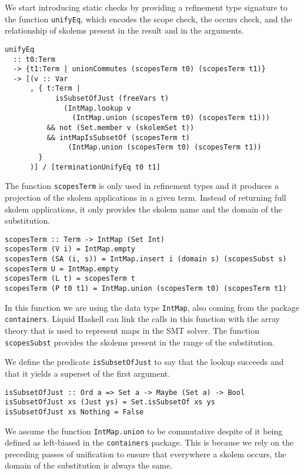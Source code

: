 \documentclass[acmtog, anonymous]{acmart}
\newcommand{\tc}[1]{{\small\texttt{#1}}}
\begin{document}
We start introducing static checks by providing a refinement type signature to
the function \tc{unifyEq}, which encodes the scope check, the occurs check,
and the relationship of skolems present in the result and in the arguments.

\begin{verbatim}
unifyEq
  :: t0:Term
  -> {t1:Term | unionCommutes (scopesTerm t0) (scopesTerm t1)}
  -> [(v :: Var
      , { t:Term |
            isSubsetOfJust (freeVars t)
              (IntMap.lookup v
                (IntMap.union (scopesTerm t0) (scopesTerm t1)))
          && not (Set.member v (skolemSet t))
          && intMapIsSubsetOf (scopesTerm t)
               (IntMap.union (scopesTerm t0) (scopesTerm t1))
        }
      )] / [terminationUnifyEq t0 t1]
\end{verbatim}

The function \tc{scopesTerm} is only used in refinement types and it produces
a projection of the skolem applications in a given term. Instead of returning
full skolem applications, it only provides the skolem name and the domain of
the substitution.

\begin{verbatim}
scopesTerm :: Term -> IntMap (Set Int)
scopesTerm (V i) = IntMap.empty
scopesTerm (SA (i, s)) = IntMap.insert i (domain s) (scopesSubst s)
scopesTerm U = IntMap.empty
scopesTerm (L t) = scopesTerm t
scopesTerm (P t0 t1) = IntMap.union (scopesTerm t0) (scopesTerm t1)
\end{verbatim}

In this function we are using the data type \tc{IntMap}, also coming from the
package \tc{containers}. Liquid Haskell can link the calls in this function
with the array theory that is used to represent maps in the SMT solver.
The function \tc{scopesSubst} provides the skolems present in the range of
the substitution.

We define the predicate \tc{isSubsetOfJust} to say that the lookup succeeds
and that it yields a superset of the first argument.

\begin{verbatim}
isSubsetOfJust :: Ord a => Set a -> Maybe (Set a) -> Bool
isSubsetOfJust xs (Just ys) = Set.isSubsetOf xs ys
isSubsetOfJust xs Nothing = False
\end{verbatim}

We assume the function \tc{IntMap.union} to be commutative despite of it being
defined as left-biased in the \tc{containers} package. This is because we
rely on the preceding passes of unification to ensure that everywhere a
skolem occurs, the domain of the substitution is always the same.
\end{document}
